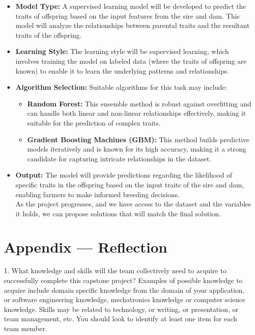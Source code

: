 \documentclass[12pt]{article}
\begin{document}
\begin{itemize}
    \item \textbf{Model Type:} A supervised learning model will be developed to 
    predict the traits of offspring based on the input features from the sire 
    and dam. This model will analyze the relationships between parental traits 
    and the resultant traits of the offspring.

    \item \textbf{Learning Style:} The learning style will be supervised 
    learning, which involves training the model on labeled data (where the 
    traits of offspring are known) to enable it to learn the underlying 
    patterns and relationships.

    \item \textbf{Algorithm Selection:} Suitable algorithms for this task may 
    include:
    \begin{itemize}
        \item \textbf{Random Forest:} This ensemble method is robust against 
        overfitting and can handle both linear and non-linear relationships 
        effectively, making it suitable for the prediction of complex traits.
        \item \textbf{Gradient Boosting Machines (GBM):} This method builds 
        predictive models iteratively and is known for its high accuracy, 
        making it a strong candidate for capturing intricate relationships in 
        the dataset.
    \end{itemize}

    \item \textbf{Output:} The model will provide predictions regarding the 
    likelihood of specific traits in the offspring based on the input traits of 
    the sire and dam, enabling farmers to make informed breeding decisions.
\\
As the project progresses, and we have access to the dataset and the variables 
it holds, we can propose solutions that will match the final solution.
\end{itemize}




\newpage{}
\section*{Appendix --- Reflection}

1. What knowledge and skills will the team collectively need to acquire to
successfully complete this capstone project?  Examples of possible knowledge
to acquire include domain specific knowledge from the domain of your
application, or software engineering knowledge, mechatronics knowledge or
computer science knowledge.  Skills may be related to technology, or writing,
or presentation, or team management, etc.  You should look to identify at
least one item for each team member. \\
\end{document}
